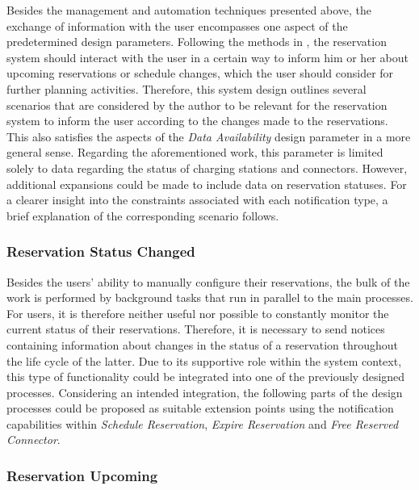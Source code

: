 Besides the management and automation techniques presented above, the exchange of information with the user encompasses one aspect of the predetermined design parameters.
Following the methods in \cite{zarkeshev_charging_2018}, the reservation system should interact with the user in a certain way to inform him or her about upcoming reservations or schedule changes, which the user should consider for further planning activities.
Therefore, this system design outlines several scenarios that are considered by the author to be relevant for the reservation system to inform the user according to the changes made to the reservations. 
This also satisfies the aspects of the \textit{Data Availability} design parameter in a more general sense. Regarding the aforementioned work, this parameter is limited solely to data regarding the status of charging stations and connectors. However, additional expansions could be made to include data on reservation statuses.
For a clearer insight into the constraints associated with each notification type, a brief explanation of the corresponding scenario follows. 

\subsubsection{Reservation Status Changed}
\label{ch:Design:sec:Reservation System:ssec:Notification Capabilities:sssec:Reservation Status Changed}

Besides the users' ability to manually configure their reservations, the bulk of the work is performed by background tasks that run in parallel to the main processes.
For users, it is therefore neither useful nor possible to constantly monitor the current status of their reservations. Therefore, it is necessary to send notices containing information about changes in the status of a reservation throughout the life cycle of the latter.
Due to its supportive role within the system context, this type of functionality could be integrated into one of the previously designed processes. 
Considering an intended integration, the following parts of the design processes could be proposed as suitable extension points using the notification capabilities within \textit{Schedule Reservation}, \textit{Expire Reservation} and \textit{Free Reserved Connector}.

\subsubsection{Reservation Upcoming}
\label{ch:Design:sec:Reservation System:ssec:Notification Capabilities:sssec:Reservation Upcoming}

